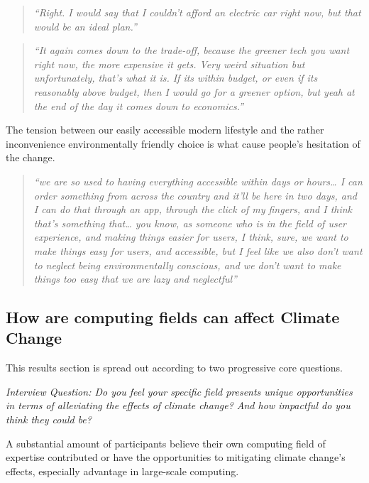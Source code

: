     \begin{quote}
        \textit{“Right. I would say that I couldn’t afford an electric car right now, but that would be an ideal plan.”}
    \end{quote}
    
    \begin{quote}
        \textit{“It again comes down to the trade-off, because the greener tech you want right now, the more expensive it gets. Very weird situation but unfortunately, that’s what it is. If its within budget, or even if its reasonably above budget, then I would go for a greener option, but yeah at the end of the day it comes down to economics.”}
    \end{quote}
    
    The tension between our easily accessible modern lifestyle and the rather inconvenience environmentally friendly choice is what cause people’s hesitation of the change.
    
    \begin{quote}
        \textit{“we are so used to having everything accessible within days or hours… I can order something from across the country and it’ll be here in two days, and I can do that through an app, through the click of my fingers, and I think that’s something that… you know, as someone who is in the field of user experience, and making things easier for users, I think, sure, we want to make things easy for users, and accessible, but I feel like we also don’t want to neglect being environmentally conscious, and we don’t want to make things too easy that we are lazy and neglectful”}
    \end{quote}

    
    
    
    

\subsection{How are computing fields can affect Climate Change}

    This results section is spread out according to two progressive core questions.
    
    \emph{Interview Question: Do you feel your specific field presents unique opportunities in terms of alleviating the effects of climate change? And how impactful do you think they could be?}
    
    A substantial amount of participants believe their own computing field of expertise contributed or have the opportunities to mitigating climate change's effects, especially advantage in large-scale computing.
        
